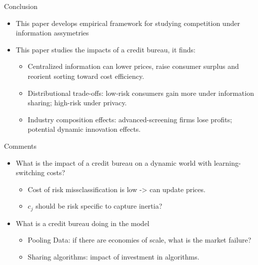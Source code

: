 \documentclass[10pt,aspectratio=169]{beamer}
\begin{document}
\begin{frame}{Conclusion}
\begin{itemize}
  \item This paper develops empirical framework for studying competition under information assymetries 
  \item This paper studies the impacts of a credit bureau, it finds: 
  \begin{itemize}
    \item Centralized information can  lower prices, raise consumer surplus and reorient sorting toward cost efficiency.
  \item Distributional trade-offs: low-risk consumers gain more under information sharing; high-risk under privacy.
  \item Industry composition effects: advanced-screening firms lose profits; potential dynamic innovation effects.
\end{itemize}
\end{itemize}
\end{frame}

\begin{frame}{Comments }
\begin{itemize}
  \item What is the impact of a credit bureau on a dynamic world with learning-switching costs? 
  \begin{itemize}
    \item Cost of risk missclassification is low -> can update prices. 
    \item $c_j$ should be risk specific to capture inertia? 
  \end{itemize}
  \item What is a credit bureau doing in the model 
  \begin{itemize}
    \item Pooling Data: if there are economies of scale, what is the market failure? 
    \item Sharing algorithms: impact of investment in algorithms. 
  \end{itemize}
\end{itemize}
\end{frame}



\end{document}
